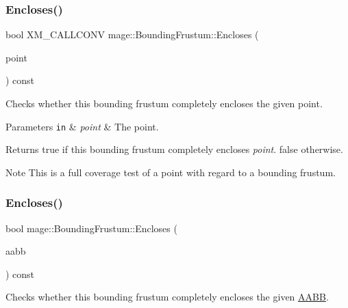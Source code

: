 \subsubsection{\texorpdfstring{Encloses()}{Encloses()}\hspace{0.1cm}{\footnotesize\ttfamily [2/4]}}
{\footnotesize\ttfamily bool X\+M\+\_\+\+C\+A\+L\+L\+C\+O\+NV mage\+::\+Bounding\+Frustum\+::\+Encloses (\begin{DoxyParamCaption}\item[{F\+X\+M\+V\+E\+C\+T\+OR}]{point }\end{DoxyParamCaption}) const\hspace{0.3cm}{\ttfamily [noexcept]}}

Checks whether this bounding frustum completely encloses the given point.


\begin{DoxyParams}[1]{Parameters}
\mbox{\tt in}  & {\em point} & The point. \\
\hline
\end{DoxyParams}
\begin{DoxyReturn}{Returns}
{\ttfamily true} if this bounding frustum completely encloses {\itshape point}. {\ttfamily false} otherwise. 
\end{DoxyReturn}
\begin{DoxyNote}{Note}
This is a full coverage test of a point with regard to a bounding frustum. 
\end{DoxyNote}
\hypertarget{classmage_1_1_bounding_frustum_a09642eff00ef33d0b5ea4890c9adc4b2}{}\label{classmage_1_1_bounding_frustum_a09642eff00ef33d0b5ea4890c9adc4b2} 
\subsubsection{\texorpdfstring{Encloses()}{Encloses()}\hspace{0.1cm}{\footnotesize\ttfamily [3/4]}}
{\footnotesize\ttfamily bool mage\+::\+Bounding\+Frustum\+::\+Encloses (\begin{DoxyParamCaption}\item[{const \hyperlink{classmage_1_1_a_a_b_b}{A\+A\+BB} \&}]{aabb }\end{DoxyParamCaption}) const\hspace{0.3cm}{\ttfamily [noexcept]}}

Checks whether this bounding frustum completely encloses the given \hyperlink{classmage_1_1_a_a_b_b}{A\+A\+BB}.



